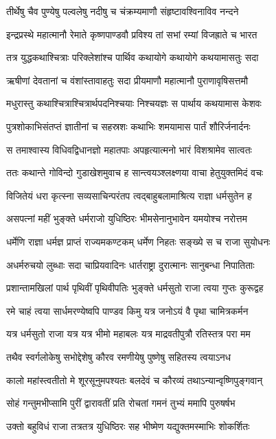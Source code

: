 \twolineshloka
{तीर्थेषु चैव पुण्येषु पल्वलेषु नदीषु च}
{चंक्रम्यमाणौ संहृष्टावश्विनाविव नन्दने}


\twolineshloka
{इन्द्रप्रस्थे महात्मानौ रेमाते कृष्णपाण्डवौ}
{प्रविश्य तां सभां रम्यां विजह्राते च भारत}


\twolineshloka
{तत्र युद्धकथाश्चित्राः परिक्लेशांश्च पार्थिव}
{कथायोगे कथायोगे कथयामासतुः सदा}


\twolineshloka
{ऋषीणां देवतानां च वंशांस्तावाहतुः सदा}
{प्रीयमाणौ महात्मानौ पुराणावृषिसत्तमौ}


\twolineshloka
{मधुरास्तु कथाश्चित्राश्चित्रार्थपदनिश्चयाः}
{निश्चयज्ञः स पार्थाय कथयामास केशवः}


\twolineshloka
{पुत्रशोकाभिसंतप्तं ज्ञातीनां च सहस्रशः}
{कथाभिः शमयामास पार्तं शौरिर्जनार्दनः}


\twolineshloka
{स तमाश्वास्य विधिवद्विधानज्ञो महातपाः}
{अपहृत्यात्मनो भारं विशश्रामेव सात्वतः}


\twolineshloka
{ततः कथान्ते गोविन्दो गुडाखेशमुवाच ह}
{सान्त्वयञ्श्लक्ष्णया वाचा हेतुयुक्तमिदं वचः}


\twolineshloka
{विजितेयं धरा कृत्स्ना सव्यसाचिन्परंतप}
{त्वद्बाहुबलामाश्रित्य राज्ञा धर्मसुतेन ह}


\twolineshloka
{असपत्नां महीं भुङ्क्ते धर्मराजो युधिष्ठिरः}
{भीमसेनानुभावेन यमयोश्च नरोत्तम}


\twolineshloka
{धर्मेणि राज्ञा धर्मज्ञ प्राप्तं राज्यमकण्टकम्}
{धर्मेण निहतः सङ्ख्ये स च राजा सुयोधनः}


\twolineshloka
{अधर्मरुचयो लुब्धाः सदा चाप्रियवादिनः}
{धार्तराष्ट्रा दुरात्मानः सानुबन्धा निपातिताः}


\twolineshloka
{प्रशान्तामखिलां पार्थ पृथिवीं पृथिवीपतिः}
{भुङ्क्ते धर्मसुतो राजा त्वया गुप्तः कुरूद्वह}


\twolineshloka
{रमे चाहं त्वया सार्धमरण्येष्वपि पाण्डव}
{किमु यत्र जनोऽयं वै पृथा चामित्रकर्मन}


\twolineshloka
{यत्र धर्मसुतो राजा यत्र यत्र भीमो महाबलः}
{यत्र माद्रवतीपुत्रौ रतिस्तत्र परा मम}


\twolineshloka
{तथैव स्वर्गलोकेषु सभोद्देशेषु कौरव}
{रमणीयेषु पुष्णेषु सहितस्य त्वयाऽनध}


\twolineshloka
{कालो महांस्त्वतीतो मे शूरसूनुमपश्यतः}
{बलदेवं च कौरव्यं तथाऽन्यान्वृष्णिपुङ्गवान्}


\twolineshloka
{सोहं गन्तुमभीप्सामि पुरीं द्वारावतीं प्रति}
{रोचतां गमनं तुभ्यं ममापि पुरुषर्षभ}


\twolineshloka
{उक्तो बहुविधं राजा तत्रतत्र युधिष्ठिरः}
{सह भीष्मेण यद्युक्तमस्माभिः शोकर्शितः}



